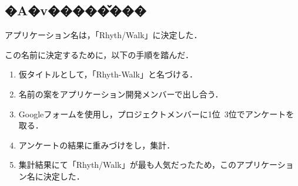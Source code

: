 \subsection{�A�v�����̌���}
アプリケーション名は，「Rhyth/Walk」に決定した．\par
この名前に決定するために，以下の手順を踏んだ．
\begin{enumerate}
\item 仮タイトルとして，「Rhyth-Walk」と名づける．
\item 名前の案をアプリケーション開発メンバーで出し合う．
\item Googleフォームを使用し，プロジェクトメンバーに1位~3位でアンケートを取る．
\item アンケートの結果に重みづけをし，集計．
\item 集計結果にて「Rhyth/Walk」が最も人気だったため，このアプリケーション名に決定した．
\end{enumerate}
